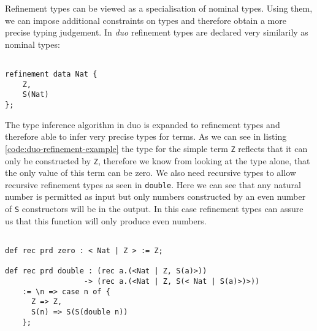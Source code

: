Refinement types can be viewed as a specialisation of nominal types.
Using them, we can impose additional constraints on types and therefore obtain a more precise typing judgement. \cite{springer} %
In \emph{duo} refinement types are declared very similarily as nominal types:

\begin{lstlisting}[style=duostyle, label=code:duo-refinement-declaration, captionpos=b, caption={Refinement type of peano numbers in \emph{duo}}]

refinement data Nat {
    Z,
    S(Nat)
};

\end{lstlisting}

The type inference algorithm in duo is expanded to refinement types and therefore able to infer very precise types for terms. \cite{binder22refinement}
As we can see in listing \ref{code:duo-refinement-example} the type for the simple term \lstinline{Z} reflects that it can only be constructed by \lstinline{Z}, therefore we know from looking at the type alone, that the only value of this term can be zero.
We also need recursive types to allow recursive refinement types as seen in \lstinline{double}.
Here we can see that any natural number is permitted as input but only numbers constructed by an even number of \lstinline{S} constructors will be in the output.
In this case refinement types can assure us that this function will only produce even numbers.

\begin{lstlisting}[style=duostyle, label=code:duo-refinement-example, captionpos=b, caption={Type inference for refinement types in \emph{duo}}]

def rec prd zero : < Nat | Z > := Z;

def rec prd double : (rec a.(<Nat | Z, S(a)>))
                  -> (rec a.(<Nat | Z, S(< Nat | S(a)>)>))
    := \n => case n of {
      Z => Z,
      S(n) => S(S(double n))
    };
    
\end{lstlisting}

